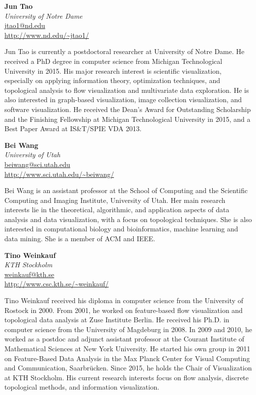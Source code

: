 \documentclass[preprint,journal]{vgtc}       %
\newcommand{\addverticalspace}{\vspace{3mm}}
\begin{document}
\noindent \textbf{Jun Tao}\\
\emph{University of Notre Dame}\\
\href{mailto:jtao1@nd.edu}{jtao1@nd.edu}\\
\url{http://www.nd.edu/~jtao1/}

\addverticalspace

Jun Tao is currently a postdoctoral researcher at University of Notre Dame. He received a PhD degree in computer science from Michigan Technological University in 2015. His major research interest is scientific visualization, especially on applying information theory, optimization techniques, and topological analysis to flow visualization and multivariate data exploration. He is also interested in graph-based visualization, image collection visualization, and software visualization. He received the Dean’s Award for Outstanding Scholarship and the Finishing Fellowship at Michigan Technological University in 2015, and a Best Paper Award at IS\&T/SPIE VDA 2013.

\printbibliography[title={Relevant Publications},category=Tao]

\noindent \textbf{Bei Wang}\\
\emph{University of Utah}\\
\href{mailto:beiwang@sci.utah.edu}{beiwang@sci.utah.edu}\\
\url{http://www.sci.utah.edu/~beiwang/}

\addverticalspace
Bei Wang is an assistant professor at the School of Computing and the Scientific Computing and Imaging Institute, University of Utah. Her main research interests lie in the theoretical, algorithmic, and application aspects of data analysis and data visualization, with a focus on topological techniques. She is also interested in computational biology and bioinformatics, machine learning and data mining. She is a member of ACM and IEEE.
\addverticalspace

\printbibliography[title={Relevant Publications},category=Wang]

\noindent \textbf{Tino Weinkauf}\\
\emph{KTH Stockholm}\\
\href{mailto:weinkauf@kth.se}{weinkauf@kth.se}\\
\url{http://www.csc.kth.se/~weinkauf/}

\addverticalspace
Tino Weinkauf received his diploma in computer science from the University of Rostock in 2000. From 2001, he worked on feature-based flow visualization and topological data analysis at Zuse Institute Berlin. He received his Ph.D. in computer science from the University of Magdeburg in 2008. In 2009 and 2010, he worked as a postdoc and adjunct assistant professor at the Courant Institute of Mathematical Sciences at New York University. He started his own group in 2011 on Feature-Based Data Analysis in the Max Planck Center for Visual Computing and Communication, Saarbrücken. Since 2015, he holds the Chair of Visualization at KTH Stockholm. His current research interests focus on flow analysis, discrete topological methods, and information visualization.
\end{document}
